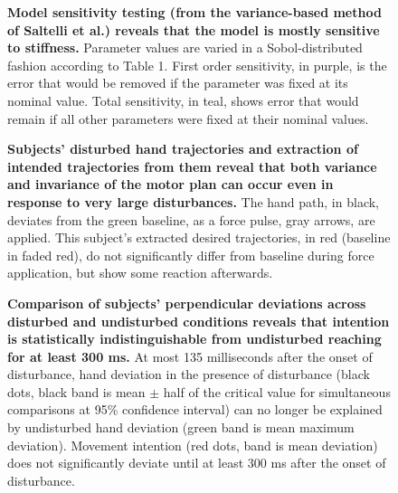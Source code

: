 \begin{figure}
\caption{
{\bf Model sensitivity testing (from the variance-based method of Saltelli et al.\cite{saltelli2010variance}) reveals that the model is mostly sensitive to stiffness.} Parameter values are varied in a Sobol-distributed fashion according to Table 1. First order sensitivity, in purple, is the error that would be removed if the parameter was fixed at its nominal value. Total sensitivity, in teal, shows error that would remain if all other parameters were fixed at their nominal values.
}
\label{fig:sensitivity}
\end{figure}

\begin{figure}
\caption{
{\bf Subjects' disturbed hand trajectories and extraction of intended trajectories from them reveal that both variance and invariance of the motor plan can occur even in response to very large disturbances.} The hand path, in black, deviates from the green baseline, as a force pulse, gray arrows, are applied. This subject's extracted desired trajectories, in red (baseline in faded red), do not significantly differ from baseline during force application, but show some reaction afterwards.
}
\label{fig:anecdotes}
\end{figure}

\begin{figure}
\caption{
{\bf Comparison of subjects' perpendicular deviations across disturbed and undisturbed conditions reveals that intention is statistically indistinguishable from undisturbed reaching for at least 300 ms.} At most 135 milliseconds after the onset of disturbance, hand deviation in the presence of disturbance (black dots, black band is mean $\pm$ half of the critical value for simultaneous comparisons at 95\% confidence interval) can no longer be explained by undisturbed hand deviation (green band is mean maximum deviation). Movement intention (red dots, band is mean deviation) does not significantly deviate until at least 300 ms after the onset of disturbance.
}
\label{fig:grouptrends}
\end{figure}
\pagebreak

